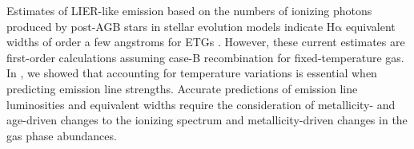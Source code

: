 \documentclass[preprint2]{aastex62}
\newcommand\Msun{\ensuremath{\,\mathrm{M_{\sun}}}\xspace}
\newcommand{\ha}{\ensuremath{\mathrm{H\alpha}}\xspace}
\newcommand{\ang}{\ensuremath{\mbox{\AA}}\xspace}
\newcommand{\Gyr}{$\,$Gyr\xspace}
\begin{document}
%
%
%
%
Estimates of LIER-like emission based on the numbers of ionizing photons produced by post-AGB stars in stellar evolution models indicate \ha equivalent widths of order a few angstroms for ETGs \citep{Maraston+2005, CidFernandes+2011, Belfiore+2016,Gomes+2016}. However, these current estimates are first-order calculations assuming case-B recombination for fixed-temperature gas. In \citet{Byler+2017}, we showed that accounting for temperature variations is essential when predicting emission line strengths. Accurate predictions of emission line luminosities and equivalent widths require the consideration of metallicity- and age-driven changes to the ionizing spectrum and metallicity-driven changes in the gas phase abundances. 
\end{document}
